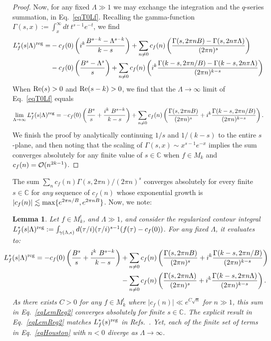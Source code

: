 \documentclass[11pt,a4paper]{article}
\newcommand{\g}{\gamma}
\newcommand{\e}{\epsilon}
\newcommand{\G}{\Gamma}
\newcommand{\La}{\Lambda}
\newtheorem{lem}[thm]{Lemma}
\def\C{\mathbb{C}}
\newcommand{\reg}{{\rm reg}}
\begin{document}
\begin{proof}
Now, for any fixed $\Lambda \gg 1$ we may exchange the integration and the $q$-series summation, in Eq.~\eqref{eqT0Lf}. Recalling the gamma-function $\G(s,x):= \int_x^{\infty} dt~t^{s-1} e^{-t}$, we find 
\begin{align}
L_f^*(s|\Lambda)^\reg = &
-c_f(0) \left( i^k  \frac{B^{s-k}-\La^{s-k}}{k-s}\right) + \sum_{n \neq 0} c_f(n) \left(\frac{\G(s,2\pi n B)-\G(s, 2 n \pi \La)}{(2\pi n)^s} \right)
\label{eqLemReg1e1}
 \\
&
-c_f(0) \left( \frac{B^{s}-\La^{s}}{s}\right) + \sum_{n \neq 0} c_f(n) \left(i^k \frac{\G(k-s,2\pi n/B)-\G(k-s, 2 n \pi \La)}{(2\pi n)^{k-s}} \right)
\nonumber
\end{align}
When ${\rm Re}(s) > 0$ and ${\rm Re}(s-k)> 0$, we find that the $\La \to \infty$ limit of Eq.~\eqref{eqT0Lf} equals
\begin{align}
\lim_{\Lambda \to \infty} L_f^*(s|\Lambda)^\reg =  -c_f(0)\left( \frac{B^s}{s} + \frac{i^k~B^{s-k}}{k-s} \right) + \sum_{n \neq 0} c_f(n) \left( \frac{\G(s,2\pi n B)}{(2\pi n)^s} + i^k \frac{\G(k-s,2\pi n/B)}{(2\pi n)^{k-s}} \right).
\end{align}
We finish the proof by analytically continuing $1/s$ and $1/(k-s)$ to the entire $s$-plane, and then noting that the scaling of $\G(s,x) \sim x^{s-1} e^{-x}$ implies the sum converges absolutely for any finite value of $s \in \C$ when $f \in M_k$ and $c_f(n) = {\cal O}(n^{2k-1})$.
\end{proof}

The sum $\sum_n c_f(n) \G(s,2\pi n)/(2 \pi n)^s$ converges absolutely for every finite $s \in \C$ for {\em any} sequence of $c_f(n)$ whose exponential growth is $|c_f(n)| \lesssim {\rm max}\{e^{2 \pi  n/B},e^{2 \pi  n B}\}$. Now, we note:

\begin{lem}\label{LemReg2}
Let $f \in M_k^!$, and $\La \gg 1$, and consider the regularized contour integral $L_f^*(s|\La)^\reg:=\int_{\g(\La,\e)} d(\tau/i) (\tau/i)^{s-1} (f(\tau) -c_f(0))$. For any fixed $\La$, it evaluates to:
\begin{align}
\!\!\!\!\!\!\!\!
L_f^*(s|\La)^\reg 
=  -c_f(0)\left( \frac{B^s}{s} + \frac{i^k~B^{s-k}}{k-s} \right) 
&+ \sum_{n \neq 0} c_f(n) \left( \frac{\G(s,2\pi n B)}{(2\pi n)^s} + i^k \frac{\G(k-s,2\pi n/B)}{(2\pi n)^{k-s}} \right)\!\!\!\!
\label{eqLemReg2}\\
&- \sum_{n \neq 0} c_f(n) \left( \frac{\G(s,2\pi n \La)}{(2\pi n)^s} + i^k \frac{\G(k-s,2\pi n \La)}{(2\pi n)^{k-s}} \right).\!\!\!\!
\label{eqHouston}
\end{align}
As there exists $C>0$ for any $f\in M_k^!$ where $|c_f(n)| \ll e^{C \sqrt{n}}$ for $n \gg 1$, this sum in Eq.~\eqref{eqLemReg2} converges absolutely for finite $s \in \C$. The explicit result in Eq.~\eqref{eqLemReg2} matches $L_f^*(s)^{\reg}$ in Refs.~\cite{03-BFI, 04-BFK, 05-BFK2}. Yet, each of the finite set of terms in Eq.~\eqref{eqHouston} with $n < 0$ diverge as $\La\to \infty$.
\end{lem}
\end{document}
